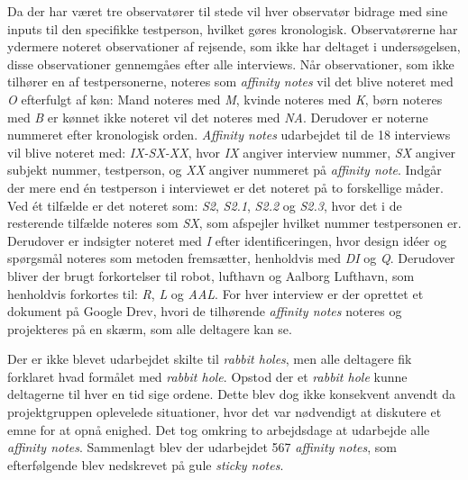 Da der har været tre observatører til stede vil hver observatør bidrage med sine inputs til den specifikke testperson, hvilket gøres kronologisk. Observatørerne har ydermere noteret observationer af rejsende, som ikke har deltaget i undersøgelsen, disse observationer gennemgåes efter alle interviews. Når observationer, som ikke tilhører en af testpersonerne, noteres som \textit{affinity notes} vil det blive noteret med \textit{O} efterfulgt af køn: Mand noteres med \textit{M}, kvinde noteres med \textit{K}, børn noteres med \textit{B} er kønnet ikke noteret vil det noteres med \textit{NA}. Derudover er noterne nummeret efter kronologisk orden. \textit{Affinity notes} udarbejdet til de 18 interviews vil blive noteret med: \textit{IX-SX-XX}, hvor \textit{IX} angiver interview nummer, \textit{SX} angiver subjekt nummer, testperson, og \textit{XX} angiver nummeret på \textit{affinity note}. Indgår der mere end én testperson i interviewet er det noteret på to forskellige måder. Ved ét tilfælde er det noteret som: \textit{S2}, \textit{S2.1}, \textit{S2.2} og \textit{S2.3}, hvor det i de resterende tilfælde noteres som \textit{SX}, som afspejler hvilket nummer testpersonen er. Derudover er indsigter noteret med \textit{I} efter identificeringen, hvor design idéer og spørgsmål noteres som metoden fremsætter, henholdvis med \textit{DI} og \textit{Q}. Derudover bliver der brugt forkortelser til robot, lufthavn og Aalborg Lufthavn, som henholdvis forkortes til: \textit{R}, \textit{L} og \textit{AAL}. For hver interview er der oprettet et dokument på Google Drev, hvori de tilhørende \textit{affinity notes} noteres og projekteres på en skærm, som alle deltagere kan se. 

Der er ikke blevet udarbejdet skilte til \textit{rabbit holes}, men alle deltagere fik forklaret hvad formålet med \textit{rabbit hole}. Opstod der et \textit{rabbit hole} kunne deltagerne til hver en tid sige ordene. Dette blev dog ikke konsekvent anvendt da projektgruppen oplevelede situationer, hvor det var nødvendigt at diskutere et emne for at opnå enighed. Det tog omkring to arbejdsdage at udarbejde alle \textit{affinity notes}. Sammenlagt blev der udarbejdet 567 \textit{affinity notes}, som efterfølgende blev nedskrevet på gule \textit{sticky notes}.   


